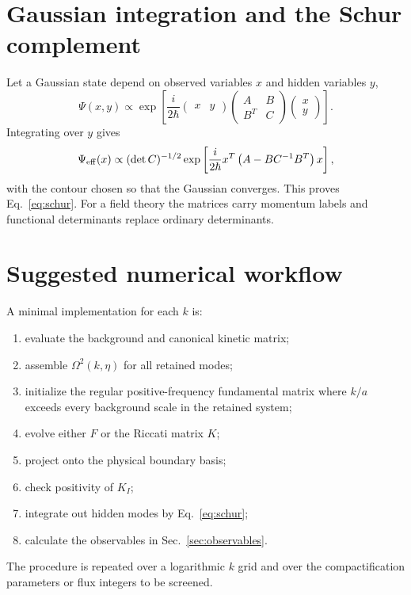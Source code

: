\documentclass[aps,prd,twocolumn,superscriptaddress,nofootinbib,longbibliography]{revtex4-2}
\begin{document}
\section{Gaussian integration and the Schur complement}
Let a Gaussian state depend on observed variables $x$ and hidden variables $y$,
\begin{equation}
\Psi(x,y)\propto\exp\left[\frac{i}{2\hbar}
\begin{pmatrix}x&y\end{pmatrix}
\begin{pmatrix}A&B\\B^T&C\end{pmatrix}
\begin{pmatrix}x\\y\end{pmatrix}\right].
\end{equation}
Integrating over $y$ gives
\begin{equation}
\Psi_{\rm eff}(x)\propto
(\det C)^{-1/2}\exp\left[\frac{i}{2\hbar}x^T
\left(A-BC^{-1}B^T\right)x\right],
\end{equation}
with the contour chosen so that the Gaussian converges. This proves Eq.~\eqref{eq:schur}. For a field theory the matrices carry momentum labels and functional determinants replace ordinary determinants.

\section{Suggested numerical workflow}
A minimal implementation for each $k$ is:
\begin{enumerate}
\item evaluate the background and canonical kinetic matrix;
\item assemble $\Omega^2(k,\eta)$ for all retained modes;
\item initialize the regular positive-frequency fundamental matrix where $k/a$ exceeds every background scale in the retained system;
\item evolve either $F$ or the Riccati matrix $K$;
\item project onto the physical boundary basis;
\item check positivity of $K_I$;
\item integrate out hidden modes by Eq.~\eqref{eq:schur};
\item calculate the observables in Sec.~\ref{sec:observables}.
\end{enumerate}
The procedure is repeated over a logarithmic $k$ grid and over the compactification parameters or flux integers to be screened.



\end{document}
